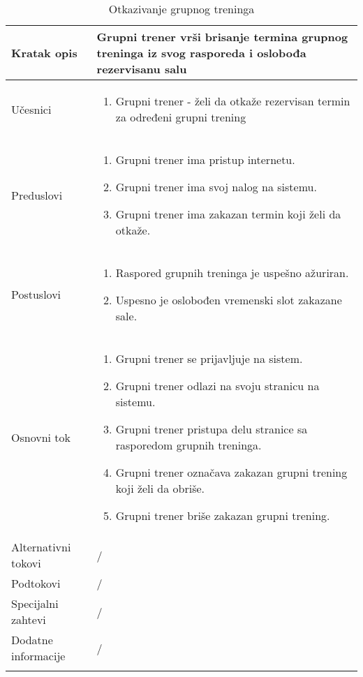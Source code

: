 \documentclass[../grupniTreninzi.tex]{subfiles}
\begin{document}
\begin{longtable}{| p{} | p{} |} 
\hline
    Kratak opis & Grupni trener vrši brisanje termina grupnog treninga iz svog rasporeda i oslobođa rezervisanu salu
    \\
\hline    
    Učesnici &
    \begin{enumerate}
        \item Grupni trener - želi da otkaže rezervisan termin za određeni grupni trening 
    \end{enumerate}\\
\hline
   Preduslovi & 
   \begin{enumerate}
        \item Grupni trener ima pristup internetu.
        \item Grupni trener ima svoj nalog na sistemu.
        \item Grupni trener ima zakazan termin koji želi da otkaže.
    \end{enumerate}\\
\hline  
    Postuslovi &
    \begin{enumerate}
        \item Raspored grupnih treninga je uspešno ažuriran.
        \item Uspesno je oslobođen vremenski slot zakazane sale.
    \end{enumerate}\\
\hline
    Osnovni tok & 
    \begin{enumerate}
        \item Grupni trener se prijavljuje na sistem.
        \item Grupni trener odlazi na svoju stranicu na sistemu.
        \item Grupni trener pristupa delu stranice sa rasporedom grupnih treninga.
        \item Grupni trener označava zakazan grupni trening koji želi da obriše.
        \item Grupni trener briše zakazan grupni trening.
    \end{enumerate}\\
\hline
    Alternativni tokovi & /\\
\hline
    Podtokovi & /\\
\hline
    Specijalni zahtevi & /\\
\hline
    Dodatne informacije & /\\
\hline
\caption{Otkazivanje grupnog treninga} %
\end{longtable}
\end{document}

